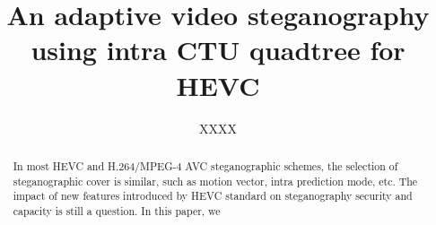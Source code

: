 \documentclass[journal,sort]{IEEEtran}
\begin{document}
\title{An adaptive video steganography using intra CTU quadtree for HEVC}
\author{XXXX}
	

\maketitle

\begin{abstract}
In most HEVC and H.264/MPEG-4 AVC steganographic schemes, the selection of steganographic cover is similar, such as motion vector, intra prediction mode, etc. The impact of new features introduced by HEVC standard on steganography security and capacity is still a question. In this paper, we 
	
	
\end{abstract}	
	
	
\end{document}
